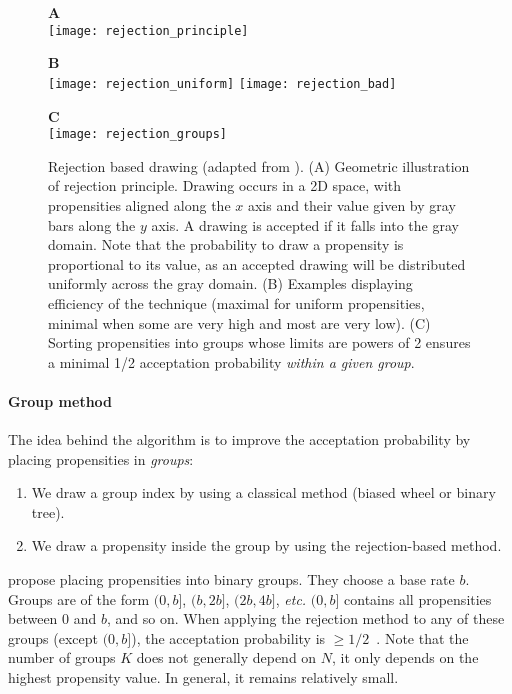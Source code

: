 \begin{figure}[!h]
  \centering
  \begin{minipage}{0.59\textwidth}
    \textbf{A} \\
    \texttt{[image: rejection\_principle]}
  \end{minipage}
  \begin{minipage}{0.39\textwidth}
    \textbf{B} \\
    \texttt{[image: rejection\_uniform]}
    \texttt{[image: rejection\_bad]}
  \end{minipage}
  \begin{minipage}{0.6\textwidth}
    \textbf{C}\\
    \texttt{[image: rejection\_groups]}  
  \end{minipage}
  \caption{Rejection based drawing (adapted from \citet{slepoy_constant-time_2008}). (A) Geometric illustration of rejection principle. Drawing occurs in a 2D space, with propensities aligned along the $x$ axis and their value given by gray bars along the $y$ axis. A drawing is accepted if it falls into the gray domain. Note that the probability to draw a propensity is proportional to its value, as an accepted drawing will be distributed uniformly across the gray domain. (B) Examples displaying efficiency of the technique (maximal for uniform propensities, minimal when some are very high and most are very low). (C) Sorting propensities into groups whose limits are powers of 2 ensures a minimal 1/2 acceptation probability \emph{within a given group}.}
  \label{fig:rejection_based_drawing}
\end {figure}

 \paragraph{Group method} The idea behind the algorithm is to improve the acceptation probability by placing propensities in \emph{groups}:
\begin{enumerate}
\item We draw a group index by using a classical method (biased wheel or binary tree).
\item We draw a propensity inside the group by using the rejection-based method.
\end{enumerate}

\citet{slepoy_constant-time_2008} propose placing propensities into binary groups. They choose a base rate $b$. Groups are of the form $(0, b]$, $(b, 2b]$, $(2b, 4b]$, \textit{etc.} $(0,b]$ contains all propensities between 0 and $b$, and so on. When applying the rejection method to any of these groups (except $(0, b]$), the acceptation probability is $\geq 1/2$~. Note that the number of groups $K$ does not generally depend on $N$, it only depends on the highest propensity value. In general, it remains relatively small.

